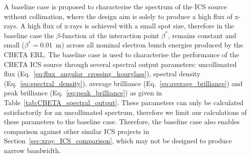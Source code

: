 \documentclass[../main.tex]{subfiles}
\begin{document}
A baseline case is proposed to characterise the spectrum of the ICS source without collimation, where the design aim is solely to produce a high flux of x-rays. A high flux of x-rays is achieved with a small spot size, therefore in the baseline case the $\beta$-function at the interaction point $\beta^{*}$, remains constant and small ($\beta^{*}=0.01$~\si{\meter}) across all nominal electron bunch energies produced by the CBETA ERL. The baseline case is used to characterise the performance of the CBETA ICS source through several spectral output parameters: uncollimated flux (Eq.~\ref{eq:flux_angular_crossing_hourglass}), spectral density (Eq.~\ref{eq:spectral_density}), average brilliance (Eq.~\ref{eq:average_brilliance}) and peak brilliance (Eq.~\ref{eq:peak_brilliance}) as given in Table~\ref{tab:CBETA_spectral_output}. These parameters can only be calculated satisfactorily for an uncollimated spectrum, therefore we limit our calculations of these parameters to the baseline case.  Therefore, the baseline case also enables comparison against other similar ICS projects in Section~\ref{sec:xray_ICS_comparison}, which may not be designed to produce narrow bandwidth. 
\end{document}
